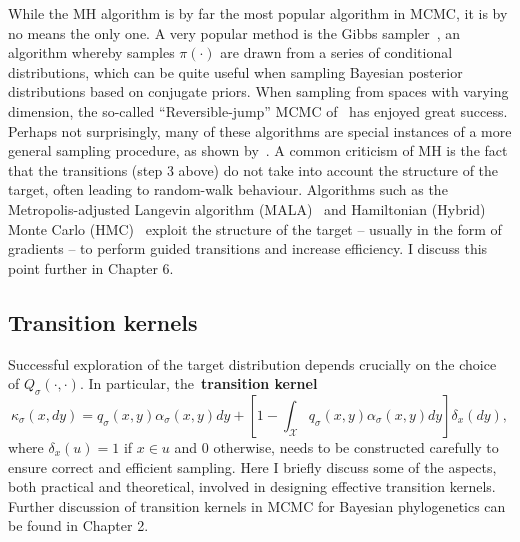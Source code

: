 While the MH algorithm is by far the most popular algorithm in MCMC, it is by no means the only one.
A very popular method is the Gibbs sampler~\citep{Geman1984}, an algorithm whereby samples $\pi(\cdot)$ are drawn from a series of conditional distributions, which can be quite useful when sampling Bayesian posterior distributions based on conjugate priors.
When sampling from spaces with varying dimension, the so-called ``Reversible-jump'' MCMC of~\cite{Green1995} has enjoyed great success.
Perhaps not surprisingly, many of these algorithms are special instances of a more general sampling procedure, as shown by~\cite{Keith2004}.
A common criticism of MH is the fact that the transitions (step 3 above) do not take into account the structure of the target, often leading to random-walk behaviour.
Algorithms such as the Metropolis-adjusted Langevin algorithm (MALA)~\citep{Roberts1998} and Hamiltonian (Hybrid) Monte Carlo (HMC)~\citep{Duane1987,Neal2011} exploit the structure of the target -- usually in the form of gradients -- to perform guided transitions and increase efficiency.
I discuss this point further in Chapter 6.

\subsection{Transition kernels}
\label{sec:kernels}

Successful exploration of the target distribution depends crucially on the choice of $Q_\sigma(\cdot, \cdot)$.
In particular, the~\textbf{transition kernel}
\begin{equation}
 \label{eq:transition_kernel}
 \kappa_\sigma(x, dy) = q_\sigma(x, y) \alpha_\sigma(x,y)dy  + \left[1 - \int_{\mathcal{X}} q_\sigma(x, y) \alpha_\sigma(x,y)dy \right]\delta_x(dy),
\end{equation}
where $\delta_x(u) = 1$ if $x \in u$ and $0$ otherwise, needs to be constructed carefully to ensure correct and efficient sampling.
Here I briefly discuss some of the aspects, both practical and theoretical, involved in designing effective transition kernels.
Further discussion of transition kernels in MCMC for Bayesian phylogenetics can be found in Chapter 2.

